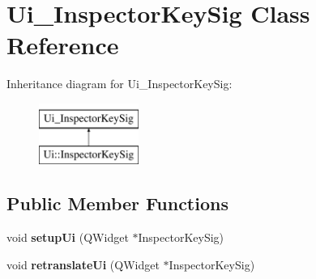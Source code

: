 \hypertarget{class_ui___inspector_key_sig}{}\section{Ui\+\_\+\+Inspector\+Key\+Sig Class Reference}
\label{class_ui___inspector_key_sig}
Inheritance diagram for Ui\+\_\+\+Inspector\+Key\+Sig\+:\begin{figure}[H]
\begin{center}
\leavevmode
\includegraphics[height=2.000000cm]{class_ui___inspector_key_sig}
\end{center}
\end{figure}
\subsection*{Public Member Functions}
\begin{DoxyCompactItemize}
\item 
\mbox{\label{class_ui___inspector_key_sig_ab29f8c0679a797dfc887388650d3a625}} 
void {\bfseries setup\+Ui} (Q\+Widget $\ast$Inspector\+Key\+Sig)
\item 
\mbox{\label{class_ui___inspector_key_sig_a5af3353b8c77ed48f44240e302493f39}} 
void {\bfseries retranslate\+Ui} (Q\+Widget $\ast$Inspector\+Key\+Sig)
\end{DoxyCompactItemize}
